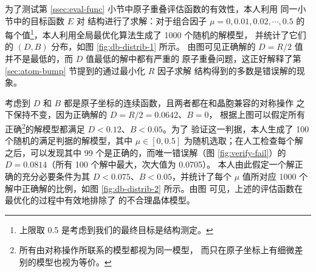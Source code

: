 为了测试第 \ref{ssec:eval-func} 小节中原子重叠评估函数的有效性，本人利用
同一小节中的目标函数 $E$ 对  结构进行了求解：对于组合因子
$\mu = 0, 0.01, 0.02, \cdots, 0.5$ 的每个值\footnote{%
	上限取 0.5 是考虑到我们的最终目标是结构测定。%
}，本人利用全局最优化算法生成了 1000 个随机的解模型，
并统计了它们的 $(D, B)$ 分布，如图 \ref{fig:db-distrib-1} 所示。
由图可见正确解的 $D = R/2$ 值并不是最低的，而 $D$ 值最低的解中都有严重的
原子重叠问题，这正好解释了第 \ref{sec:atom-bump} 节提到的通过最小化
$R$ 因子求解  结构得到的多数是错误解的现象。

\begin{figure}[htbp!]\bfcmd
{}
\end{figure}

考虑到 $D$ 和 $B$ 都是原子坐标的连续函数，且两者都在和晶胞兼容的对称操作
之下保持不变，因为正确解的 $D = R/2 = 0.0642$、$B = 0$，
根据上图可以假定所有正确\footnote{%
	所有由对称操作所联系的模型都视为同一模型，
	而只在原子坐标上有细微差别的模型也视为等价。%
}的解模型都满足 $D < 0.12$、$B < 0.05$。为了
验证这一判据，本人生成了 100 个随机的满足判据的解模型，其中 $\mu \in [0, 0.5]$
为随机选取；在人工检查每个解之后，可以发现其中 99 个是正确的，而唯一错误解（图
\ref{fig:verify-fail}）的 $D = 0.0814$（所有 100 个解中最大，次大值为 0.0705）。
本人由此假定一个解正确的充分必要条件为其 $D < 0.075$、$B < 0.05$，并统计了每个
$\mu$ 值所对应 1000 个解中正确解的比例，如图 \ref{fig:db-distrib-2} 所示。由图
可见，上述的评估函数在最优化的过程中有效地排除了  的不合理晶体模型。

